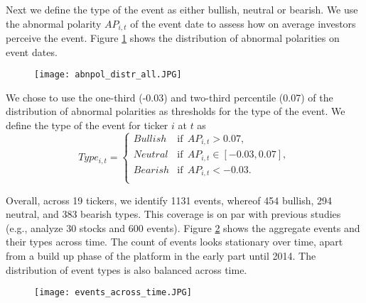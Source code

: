 Next we define the type of the event as either bullish, neutral or bearish. We use the abnormal polarity $AP_{i,t}$ of the event date to assess how on average investors perceive the event. Figure \ref{fig:abnpol_all} shows the distribution of abnormal polarities on event dates. 
\begin{figure}[h]
    \centering
    \texttt{[image: abnpol\_distr\_all.JPG]}
    \label{fig:abnpol_all}
\end{figure}
We chose to use the one-third (-0.03) and two-third percentile (0.07) of the distribution of abnormal polarities as thresholds for the type of the event. We define the type of the event for ticker $i$ at $t$ as
\begin{equation}
Type_{i,t}= \begin{cases}
      Bullish  & \text{if}\ \ AP_{i,t}> 0.07, \\
      Neutral  & \text{if}\ \ AP_{i,t} \in [-0.03, 0.07], \\
      Bearish  & \text{if}\ \ AP_{i,t} < -0.03. \\
\end{cases}    
\end{equation}    

Overall, across 19 tickers, we identify 1131 events, whereof 454 bullish, 294 neutral, and 383 bearish types. This coverage is on par with previous studies (e.g., \citet{mackinlay1997event} analyze 30 stocks and 600 events). Figure \ref{fig:events} shows the aggregate events and their types across time. The count of events looks stationary over time, apart from a build up phase of the platform in the early part until 2014. The distribution of event types is also balanced across time.

\begin{figure}[h]
    \centering
    \texttt{[image: events\_across\_time.JPG]}
    \label{fig:events}
\end{figure}

